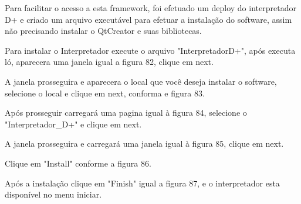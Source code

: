 \documentclass[12pt,oneside,a4paper,chapter=TITLE,section=TITLE,sumario=tradicional]{abntex2}
\begin{document}
\begin{figure}[htb]
\end{figure}


Para facilitar o acesso a esta framework, foi efetuado um deploy do interpretador D+ e criado um arquivo executável para efetuar a instalação do software, assim não precisando instalar o QtCreator e suas bibliotecas.

Para instalar o Interpretador execute o arquivo "InterpretadorD+", após executa ló, aparecera uma janela igual a figura 82, clique em next.

\begin{figure}[!htb]
\end{figure}

A janela prosseguira e aparecera o local que você deseja instalar o software, selecione o local e clique em next, conforma e figura 83.

\begin{figure}[H]
\end{figure}

Após prosseguir carregará uma pagina igual à figura 84, selecione o "Interpretador\_D+" e clique em next.

\begin{figure}[H]
\end{figure}

A janela prosseguira e carregará uma janela igual à figura 85, clique em next.

\begin{figure}[H]
\end{figure}

Clique em "Install" conforme a figura 86.

\begin{figure}[H]
\end{figure}

Após a instalação clique em "Finish" igual a figura 87, e o interpretador esta disponível no menu iniciar.

\begin{figure}[H]
\end{figure}
\end{document}
